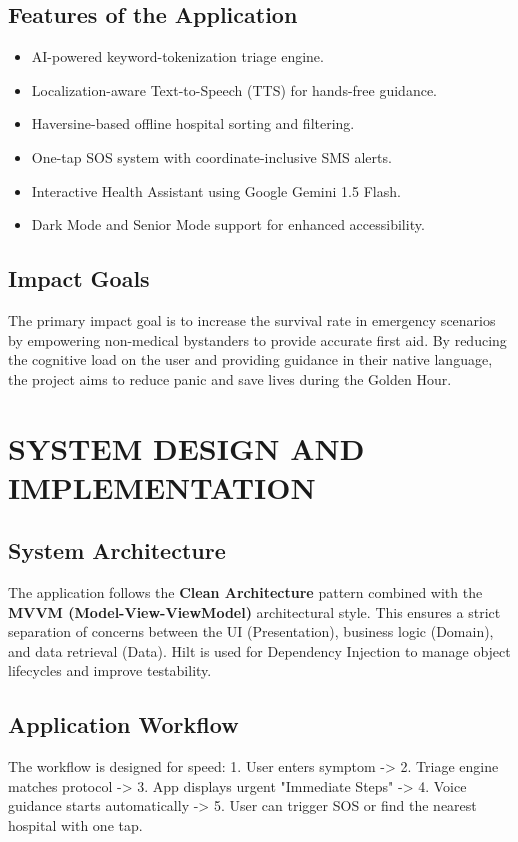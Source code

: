 \documentclass[12pt,a4paper]{report}
\begin{document}
\section{Features of the Application}
\begin{itemize}
    \item AI-powered keyword-tokenization triage engine.
    \item Localization-aware Text-to-Speech (TTS) for hands-free guidance.
    \item Haversine-based offline hospital sorting and filtering.
    \item One-tap SOS system with coordinate-inclusive SMS alerts.
    \item Interactive Health Assistant using Google Gemini 1.5 Flash.
    \item Dark Mode and Senior Mode support for enhanced accessibility.
\end{itemize}

\section{Impact Goals}
The primary impact goal is to increase the survival rate in emergency scenarios by empowering non-medical bystanders to provide accurate first aid. By reducing the cognitive load on the user and providing guidance in their native language, the project aims to reduce panic and save lives during the Golden Hour.

\newpage

\chapter{SYSTEM DESIGN AND IMPLEMENTATION}

\section{System Architecture}
The application follows the \textbf{Clean Architecture} pattern combined with the \textbf{MVVM (Model-View-ViewModel)} architectural style. This ensures a strict separation of concerns between the UI (Presentation), business logic (Domain), and data retrieval (Data). Hilt is used for Dependency Injection to manage object lifecycles and improve testability.

\section{Application Workflow}
The workflow is designed for speed:
1. User enters symptom -> 2. Triage engine matches protocol -> 3. App displays urgent "Immediate Steps" -> 4. Voice guidance starts automatically -> 5. User can trigger SOS or find the nearest hospital with one tap.
\end{document}
